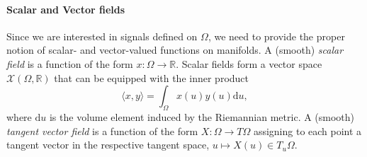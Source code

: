 \paragraph{Scalar and Vector fields}
%
Since we are interested in signals defined on $\Omega$, we need to provide the proper notion of scalar-
and vector-valued functions on manifolds. 
%
A (smooth) {\em scalar field} is a function of the form $x: \Omega\rightarrow \mathbb{R}$. 
%
Scalar fields form a vector space $\mathcal{X}(\Omega, \mathbb{R})$ that can be equipped with the inner product %
\begin{equation}
\langle x, y \rangle = \int_\Omega x(u) y(u) \mathrm{d}u,
\label{eq:inner_scalar}   
\end{equation}
%
where $\mathrm{d}u$ %
is the volume element induced by the Riemannian metric. 
%
%
A (smooth) {\em tangent vector field} is a function of the form $X: \Omega \rightarrow T\Omega$  assigning to each point a tangent vector in the respective tangent space, $u\mapsto X(u)\in T_u\Omega$.  
%
